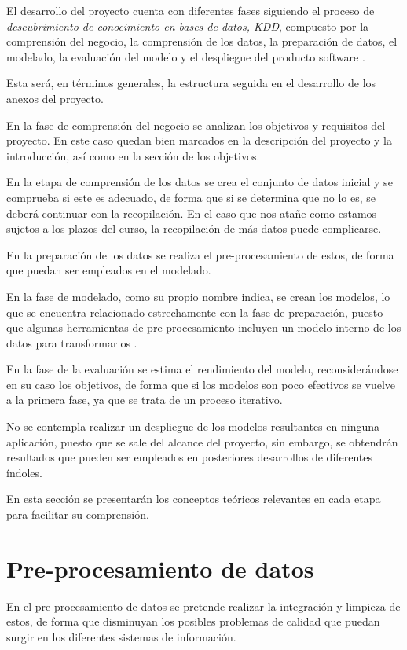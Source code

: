 El desarrollo del proyecto cuenta con diferentes fases siguiendo el proceso de \textit{descubrimiento de conocimiento
en bases de datos, KDD}, compuesto por la comprensión del negocio, la comprensión de los datos, la preparación de datos,
el modelado, la evaluación del modelo y el despliegue del producto software \cite{book:witten2017}.


Esta será, en términos generales, la estructura seguida en el desarrollo de los anexos del proyecto.

En la fase de comprensión del negocio se analizan los objetivos y requisitos del proyecto. 
En este caso quedan bien marcados en la descripción del proyecto y la introducción, así como en la sección de los objetivos.

En la etapa de comprensión de los datos se crea el conjunto de datos inicial y se comprueba si este es adecuado,
de forma que si se determina que no lo es, se deberá continuar con la recopilación.
En el caso que nos atañe como estamos sujetos a los plazos del curso, la recopilación de más datos puede complicarse.

En la preparación de los datos se realiza el pre-procesamiento de estos, de forma que puedan ser empleados en el modelado.

En la fase de modelado, como su propio nombre indica, se crean los modelos, lo que se encuentra relacionado estrechamente con
la fase de preparación, puesto que algunas herramientas de pre-procesamiento incluyen un modelo interno 
de los datos para transformarlos \cite{book:witten2017}.

En la fase de la evaluación se estima el rendimiento del modelo, reconsiderándose en su caso los objetivos, de forma 
que si los modelos son poco efectivos se vuelve a la primera fase, ya que se trata de
un proceso iterativo.

No se contempla realizar un despliegue de los modelos resultantes en ninguna aplicación, puesto que se sale del alcance del proyecto,
sin embargo, se obtendrán resultados que pueden ser empleados en posteriores desarrollos de diferentes
índoles.

En esta sección se presentarán los conceptos teóricos relevantes en cada etapa para facilitar su comprensión.

\section{Pre-procesamiento de datos}
En el pre-procesamiento de datos se pretende realizar la integración y limpieza de estos, de forma que disminuyan los posibles problemas
de calidad que puedan surgir en los diferentes sistemas de información.

